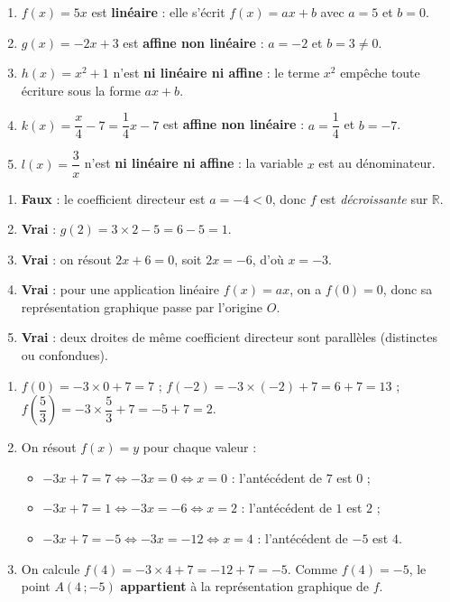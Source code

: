 \documentclass[11pt]{article}
\begin{document}
\begin{corrige}
\begin{enumerate}
\item $f(x)=5x$ est \textbf{linéaire} : elle s'écrit $f(x)=ax+b$ avec $a=5$ et $b=0$.
\item $g(x)=-2x+3$ est \textbf{affine non linéaire} : $a=-2$ et $b=3\neq 0$.
\item $h(x)=x^2+1$ n'est \textbf{ni linéaire ni affine} : le terme $x^2$ empêche toute écriture sous la forme $ax+b$.
\item $k(x)=\dfrac{x}{4}-7=\dfrac{1}{4}x-7$ est \textbf{affine non linéaire} : $a=\dfrac{1}{4}$ et $b=-7$.
\item $l(x)=\dfrac{3}{x}$ n'est \textbf{ni linéaire ni affine} : la variable $x$ est au dénominateur.
\end{enumerate}
\end{corrige}

\begin{corrige}
\begin{enumerate}
\item \textbf{Faux} : le coefficient directeur est $a=-4<0$, donc $f$ est \emph{décroissante} sur $\mathbb{R}$.
\item \textbf{Vrai} : $g(2)=3\times 2-5=6-5=1$.
\item \textbf{Vrai} : on résout $2x+6=0$, soit $2x=-6$, d'où $x=-3$.
\item \textbf{Vrai} : pour une application linéaire $f(x)=ax$, on a $f(0)=0$, donc sa représentation graphique passe par l'origine $O$.
\item \textbf{Vrai} : deux droites de même coefficient directeur sont parallèles (distinctes ou confondues).
\end{enumerate}
\end{corrige}

\begin{corrige}
\begin{enumerate}
\item $f(0)=-3\times 0+7=7$ ; $f(-2)=-3\times(-2)+7=6+7=13$ ; $f\left(\dfrac{5}{3}\right)=-3\times\dfrac{5}{3}+7=-5+7=2$.
\item On résout $f(x)=y$ pour chaque valeur :
\begin{itemize}
\item $-3x+7=7 \iff -3x=0 \iff x=0$ : l'antécédent de $7$ est $0$ ;
\item $-3x+7=1 \iff -3x=-6 \iff x=2$ : l'antécédent de $1$ est $2$ ;
\item $-3x+7=-5 \iff -3x=-12 \iff x=4$ : l'antécédent de $-5$ est $4$.
\end{itemize}
\item On calcule $f(4)=-3\times 4+7=-12+7=-5$. Comme $f(4)=-5$, le point $A(4\,;-5)$ \textbf{appartient} à la représentation graphique de $f$.
\end{enumerate}
\end{corrige}
\end{document}
